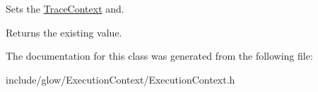 Sets the \hyperlink{classglow_1_1_trace_context}{Trace\+Context} and. 

\begin{DoxyReturn}{Returns}
the existing value. 
\end{DoxyReturn}


The documentation for this class was generated from the following file\+:\begin{DoxyCompactItemize}
\item 
include/glow/\+Execution\+Context/Execution\+Context.\+h\end{DoxyCompactItemize}
